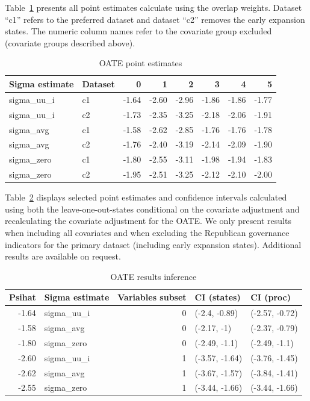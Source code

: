 \documentclass[12pt]{article}
\begin{document}
Table~\ref{tab:oatesensitive} presents all point estimates calculate using the overlap weights. Dataset ``c1'' refers to the preferred dataset and dataset ``c2'' removes the early expansion states. The numeric column names refer to the covariate group excluded (covariate groups described above).

\begin{table}[ht]
\begin{tabular}{llrrrrrr}
  \toprule
Sigma estimate & Dataset & 0 & 1 & 2 & 3 & 4 & 5 \\ 
  \midrule
sigma\_uu\_i & c1 & -1.64 & -2.60 & -2.96 & -1.86 & -1.86 & -1.77 \\ 
  sigma\_uu\_i & c2 & -1.73 & -2.35 & -3.25 & -2.18 & -2.06 & -1.91 \\ 
  sigma\_avg & c1 & -1.58 & -2.62 & -2.85 & -1.76 & -1.76 & -1.78 \\ 
  sigma\_avg & c2 & -1.76 & -2.40 & -3.19 & -2.14 & -2.09 & -1.90 \\ 
  sigma\_zero & c1 & -1.80 & -2.55 & -3.11 & -1.98 & -1.94 & -1.83 \\ 
  sigma\_zero & c2 & -1.95 & -2.51 & -3.25 & -2.12 & -2.10 & -2.00 \\ 
   \bottomrule
\end{tabular}
\caption{OATE point estimates}
\label{tab:oatesensitive}
\end{table}

Table~\ref{tab:oateconfint} displays selected point estimates and confidence intervals calculated using both the leave-one-out-states conditional on the covariate adjustment and recalculating the covariate adjustment for the OATE. We only present results when including all covariates and when excluding the Republican governance indicators for the primary dataset (including early expansion states). Additional results are available on request.

\begin{table}[ht]
\begin{tabular}{rlrll}
  \toprule
Psihat & Sigma estimate & Variables subset & CI (states) & CI (proc) \\ 
  \midrule
-1.64 & sigma\_uu\_i & 0 & (-2.4, -0.89) & (-2.57, -0.72) \\ 
  -1.58 & sigma\_avg & 0 & (-2.17, -1) & (-2.37, -0.79) \\ 
  -1.80 & sigma\_zero & 0 & (-2.49, -1.1) & (-2.49, -1.1) \\ 
  -2.60 & sigma\_uu\_i & 1 & (-3.57, -1.64) & (-3.76, -1.45) \\ 
  -2.62 & sigma\_avg & 1 & (-3.67, -1.57) & (-3.84, -1.41) \\ 
  -2.55 & sigma\_zero & 1 & (-3.44, -1.66) & (-3.44, -1.66) \\ 
   \bottomrule
\end{tabular}
\caption{OATE results inference}
\label{tab:oateconfint}
\end{table}
\end{document}
